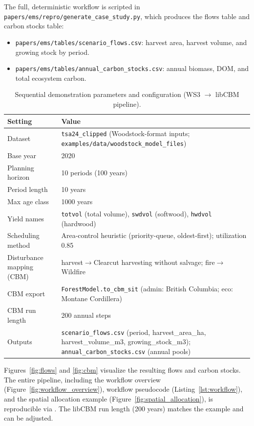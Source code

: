 \documentclass[review]{elsarticle}
\begin{document}
The full, deterministic workflow is scripted in \texttt{papers/ems/repro/generate\_case\_study.py}, which produces the flows table and carbon stocks table:
\begin{itemize}
  \item \texttt{papers/ems/tables/scenario\_flows.csv}: harvest area, harvest volume, and growing stock by period.
  \item \texttt{papers/ems/tables/annual\_carbon\_stocks.csv}: annual biomass, DOM, and total ecosystem carbon.
\end{itemize}
\begin{table}[h]
\centering
\caption{Sequential demonstration parameters and configuration (WS3 $\to$ libCBM pipeline).}
\begin{tabular}{p{4.2cm}p{9.5cm}}
\toprule
Setting & Value \\
\midrule
Dataset & \texttt{tsa24\_clipped} (Woodstock-format inputs; \texttt{examples/data/woodstock\_model\_files}) \\
Base year & 2020 \\
Planning horizon & 10 periods (100 years) \\
Period length & 10 years \\
Max age class & 1000 years \\
Yield names & \texttt{totvol} (total volume), \texttt{swdvol} (softwood), \texttt{hwdvol} (hardwood) \\
Scheduling method & Area-control heuristic (priority-queue, oldest-first); utilization 0.85 \\
Disturbance mapping (CBM) & harvest$\to$Clearcut harvesting without salvage; fire$\to$Wildfire \\
CBM export & \texttt{ForestModel.to\_cbm\_sit} (admin: British Columbia; eco: Montane Cordillera) \\
CBM run length & 200 annual steps \\
Outputs & \texttt{scenario\_flows.csv} (period, harvest\_area\_ha, harvest\_volume\_m3, growing\_stock\_m3); \texttt{annual\_carbon\_stocks.csv} (annual pools) \\
\bottomrule
\end{tabular}
\label{tab:case_params}
\end{table}

Figures~\ref{fig:flows} and \ref{fig:cbm} visualize the resulting flows and carbon stocks. The entire pipeline, including the workflow overview (Figure~\ref{fig:workflow_overview}), workflow pseudocode (Listing~\ref{lst:workflow}), and the spatial allocation example (Figure~\ref{fig:spatial_allocation}), is reproducible via . The libCBM run length (200 years) matches the example and can be adjusted.
\end{document}
